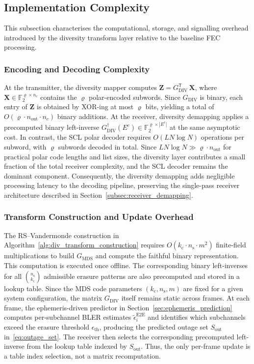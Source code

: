 \documentclass[lettersize,journal]{IEEEtran}
\providecommand{\DIFadd}[1]{{\protect\color{blue}#1}} %
\begin{document}
{\color{blue}
\subsection{\DIFadd{Implementation Complexity}}
\label{sec:complexity}

\DIFadd{This subsection characterises the computational, storage, and
signalling overhead introduced by the diversity transform layer
relative to the baseline FEC processing.
}

\subsubsection{\DIFadd{Encoding and Decoding Complexity}}
\DIFadd{At the transmitter, the diversity mapper computes
$\mathbf{Z} = G_{\mathrm{DIV}}^{\mathsf{T}}\,\mathbf{X}$, where
$\mathbf{X} \in \mathbb{F}_2^{\varrho \times n_c}$ contains the
$\varrho$ polar-encoded subwords. Since $G_{\mathrm{DIV}}$ is binary,
each entry of $\mathbf{Z}$ is obtained by XOR-ing at most $\varrho$
bits, yielding a total of
$O(\varrho \cdot n_{\mathrm{out}} \cdot n_c)$ binary additions.
At the receiver, diversity demapping applies a precomputed binary
left-inverse
$G_{\mathrm{DIV}}^{\dagger}(E^c) \in
\mathbb{F}_2^{\varrho \times |E^c|}$
at the same asymptotic cost. In contrast, the SCL polar decoder
requires $O(L N \log N)$ operations per subword, with $\varrho$
subwords decoded in total. Since $L N \log N \gg \varrho \cdot
n_{\mathrm{out}}$ for practical polar code lengths and list sizes,
the diversity layer contributes a small fraction of the total
receiver complexity, and the SCL decoder remains the dominant
component. Consequently, the diversity demapping adds negligible
processing latency to the decoding pipeline, preserving the
single-pass receiver architecture described in
Section~\ref{subsec:receiver_demapping}.
}

\subsubsection{\DIFadd{Transform Construction and Update Overhead}}
\DIFadd{The RS--Vandermonde construction in
Algorithm~\ref{alg:div_transform_construction} requires
$O(k_{\mathrm{c}} \cdot n_{\mathrm{s}} \cdot m^2)$ finite-field
multiplications to build $G_{\mathrm{MDS}}$ and compute the faithful
binary representation. This computation is executed once offline.
The corresponding binary left-inverses for all
$\binom{n_{\mathrm{s}}}{k_{\mathrm{c}}}$ admissible erasure
patterns are also precomputed and stored in a lookup table.
Since the MDS code parameters $(k_{\mathrm{c}}, n_{\mathrm{s}}, m)$
are fixed for a given system configuration, the matrix
$G_{\mathrm{DIV}}$ itself remains static across frames.
At each frame, the ephemeris-driven predictor in
Section~\ref{sec:ephemeris_prediction} computes per-subchannel
BLER estimates $\tilde{\epsilon}_{i}^{\mathrm{E2E}}$ and
identifies which subchannels exceed the erasure threshold
$\epsilon_{\mathrm{th}}$, producing the predicted outage set
$S_{\mathrm{out}}$ in~\eqref{eq:outage_set}. The receiver then
selects the corresponding precomputed left-inverse from the
lookup table indexed by $S_{\mathrm{out}}$. Thus, the only
per-frame update is a table index selection, not a matrix
recomputation.
}

}
\end{document}

